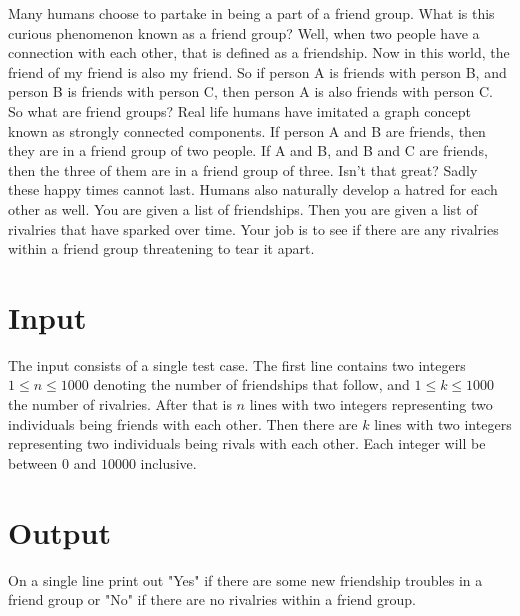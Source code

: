 
Many humans choose to partake in being a part of a friend group. What is this curious phenomenon known as a friend group? Well, when two people have a connection with each other, that is defined as a friendship. Now in this world, the friend of my friend is also my friend. So if person A is friends with person B, and person B is friends with person C, then person A is also friends with person C. So what are friend groups? Real life humans have imitated a graph concept known as strongly connected components. If person A and B are friends, then they are in a friend group of two people. If A and B, and B and C are friends, then the three of them are in a friend group of three. Isn't that great? Sadly these happy times cannot last. Humans also naturally develop a hatred for each other as well. You are given a list of friendships. Then you are given a list of rivalries that have sparked over time. Your job is to see if there are any rivalries within a friend group threatening to tear it apart.

\section*{Input}

The input consists of a single test case. The first line contains two integers $1 \le n \le 1000$ denoting the number of friendships that follow, and $1 \le k \le 1000$ the number of rivalries. After that is $n$ lines with two integers representing two individuals being friends with each other. Then there are $k$ lines with two integers representing two individuals being rivals with each other. Each integer will be between $0$ and $10000$ inclusive.

\section*{Output}

On a single line print out "Yes" if there are some new friendship troubles in a friend group or "No" if there are no rivalries within a friend group.

